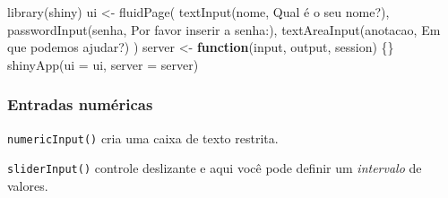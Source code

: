 \documentclass[
]{book}
\newenvironment{Shaded}{\begin{snugshade}}{\end{snugshade}}
\newcommand{\AttributeTok}[1]{\textcolor[rgb]{0.77,0.63,0.00}{#1}}
\newcommand{\ControlFlowTok}[1]{\textcolor[rgb]{0.13,0.29,0.53}{\textbf{#1}}}
\newcommand{\FunctionTok}[1]{\textcolor[rgb]{0.00,0.00,0.00}{#1}}
\newcommand{\NormalTok}[1]{#1}
\newcommand{\OtherTok}[1]{\textcolor[rgb]{0.56,0.35,0.01}{#1}}
\newcommand{\StringTok}[1]{\textcolor[rgb]{0.31,0.60,0.02}{#1}}
\begin{document}
\begin{Shaded}
\begin{Highlighting}[]
\FunctionTok{library}\NormalTok{(shiny)}
\NormalTok{ui }\OtherTok{\textless{}{-}} \FunctionTok{fluidPage}\NormalTok{(}
  \FunctionTok{textInput}\NormalTok{(}\StringTok{\textquotesingle{}nome\textquotesingle{}}\NormalTok{, }\StringTok{\textquotesingle{}Qual é o seu nome?\textquotesingle{}}\NormalTok{),}
  \FunctionTok{passwordInput}\NormalTok{(}\StringTok{\textquotesingle{}senha\textquotesingle{}}\NormalTok{, }\StringTok{\textquotesingle{}Por favor inserir a senha:\textquotesingle{}}\NormalTok{),}
  \FunctionTok{textAreaInput}\NormalTok{(}\StringTok{\textquotesingle{}anotacao\textquotesingle{}}\NormalTok{, }\StringTok{\textquotesingle{}Em que podemos ajudar?\textquotesingle{}}\NormalTok{)}
\NormalTok{)}
\NormalTok{server }\OtherTok{\textless{}{-}} \ControlFlowTok{function}\NormalTok{(input, output, session) \{\}}
\FunctionTok{shinyApp}\NormalTok{(}\AttributeTok{ui =}\NormalTok{ ui, }\AttributeTok{server =}\NormalTok{ server)}
\end{Highlighting}
\end{Shaded}

\hypertarget{entradas-numuxe9ricas}{%
\subsubsection{\texorpdfstring{\textbf{Entradas numéricas}}{Entradas numéricas}}\label{entradas-numuxe9ricas}}

\texttt{numericInput()} cria uma caixa de texto restrita.

\texttt{sliderInput()} controle deslizante e aqui você pode definir um \emph{intervalo} de valores.
\end{document}
